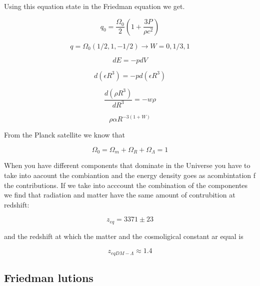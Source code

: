 \documentclass[a4paper, 12pt]{article} %
\begin{document}
Using this equation state in the Friedman equation 
we get. 

\begin{equation}
q_0 = \dfrac{\Omega_0}{2}(1 + \dfrac{3P}{\rho c^2})
\end{equation} 

\begin{equation}
q = \Omega_0 (1/2, 1, -1/2) \rightarrow W= 0, 1/3, 1
\end{equation}

\begin{equation}
dE = -pdV
\end{equation}

\begin{equation}
d(\epsilon R^3) = - p d(\epsilon R^3)
\end{equation}

\begin{equation}
\dfrac{d(\rho R^3)}{d R^3} = -w \rho
\end{equation}

\begin{equation}
\rho \alpha R^{-3(1+W)}
\end{equation}

From the Planck satellite we know that

\begin{equation}
\Omega_0 = \Omega_m + \Omega_R + \Omega_{\Lambda} = 1 
\end{equation}

When you have different components that dominate in the Universe 
you have to take into aacount the combiantion and the energy density 
goes as acombintation f the contributions. If we take into acccount 
the combination of the componentes we find that radiation and 
matter have the same amount of contrubition at redshift:

\begin{equation}
z_{eq} = 3371 \pm 23
\end{equation}

and the redshift at which the matter and the cosmoligical constant ar 
equal is 

\begin{equation}
z_{eq DM - \Lambda} \approx 1.4
\end{equation}

\subsection{Friedman lutions}
\end{document}
